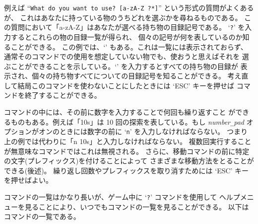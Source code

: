 例えば
``{\tt What do you want to use? [a-zA-Z\ ?*]}'' という形式の質問がよくあるが、
これはあなたに持っている物のうちどれを選ぶかを尋ねるものである。
この質問において「a-zA-Z」はあなたが選べる持ち物の目録記号である。
`{\tt ?}' を入力するとこれらの物の目録一覧が得られ、
個々の記号が何を表しているのか知ることができる。
この例では、`{\tt *}' もある。これは一覧には表示されておらず、
通常そのコマンドでの使用を想定していない物でも、使おうと思えばそれを
選ぶことができることを示している。`{\tt *}' を入力するとすべての持ち物の目録が
表示され、個々の持ち物すべてについての目録記号を知ることができる。
考え直して結局このコマンドを使わないことにしたときには `ESC' キーを押せば
コマンドを終了することができる。

コマンドの中には、その前に数字を入力することで何回も繰り返すこと
ができるものもある。例えば「10s」は 10 回の探索を表している。もし
{\it number\verb+_+pad\/}
オプションがオンのときには数字の前に `{\tt n}' を入力しなければならない。
つまり上の例では代わりに「n 10s」と入力しなければならない。
複数回実行することが無意味なコマンドではこれは無視される。
さらに、移動コマンドの前に特定の文字(プレフィックス)を付けることによって
さまざまな移動方法をとることができる(後述)。
繰り返し回数やプレフィックスを取り消すためには `ESC' キーを押せばよい。

コマンドの一覧はかなり長いが、ゲーム中に `{\tt ?}' コマンドを使用して
ヘルプメニューを見ることにより、いつでもコマンドの一覧を見ることができる。
以下はコマンドの一覧である。

